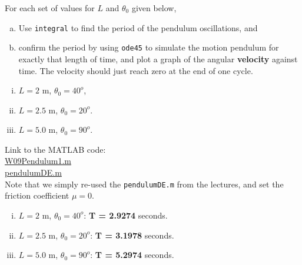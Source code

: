 \begin{enumerate}[1.]
\begin{Question}
For each set of values for $L$ and $\theta_0$ given below,
\begin{enumerate}[(a)]
\item Use \verb#integral# to find the period of the pendulum oscillations,
  and
\item confirm the period by using \verb#ode45# to simulate the motion
  pendulum for exactly that length of time, and plot a graph of the
  angular {\bf velocity} against time.  The velocity should just reach
  zero at the end of one cycle.
\end{enumerate}

\begin{enumerate}[(i)]
\item $L = 2$ m, $\theta_0 = 40^o$, 
\item $L =2.5$ m, $\theta_0 = 20^o$.
\item $L =5.0$ m, $\theta_0 = 90^o$.
\end{enumerate}
  \end{Question}

\begin{Solution}

Link to the MATLAB code: \\
\href{http://www.mast.queensu.ca/~apsc171/MNTCP01/PracticeProblems/MATLAB/W09Pendulum1.m}{W09Pendulum1.m} \\
\href{http://www.mast.queensu.ca/~apsc171/MNTCP01/PracticeProblems/MATLAB/pendulumDE.m}{pendulumDE.m} \\

Note that we simply re-used the \verb#pendulumDE.m# from the lectures,
and set the friction coefficient $\mu = 0$.
  \begin{enumerate}[(i)]
  \item $L = 2$ m, $\theta_0 = 40^o$:  {\bf T = 2.9274} seconds.
  \item $L =2.5$ m, $\theta_0 = 20^o$: {\bf T = 3.1978} seconds.
  \item $L =5.0$ m, $\theta_0 = 90^o$: {\bf T = 5.2974} seconds.
  \end{enumerate}


\end{Solution}
\end{enumerate}
